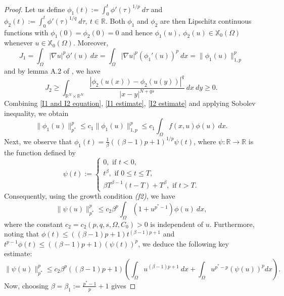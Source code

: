 \documentclass[reqno,oneside]{amsart}
\theoremstyle{definition}
\theoremstyle{remark}
\numberwithin{equation}{section}
\newcommand{\Om} {\Omega}
\newcommand{\sr}{\mathbb{R}}
\newcommand{\ba}{\beta}
\newcommand{\rar}{\rightarrow}
\newcommand{\na} {\nabla}
\newcommand{\xo}{\mathbb{X}_0}
\begin{document}
\begin{proof}
    Let us define $\displaystyle \phi_1 (t):= \int_0^t \phi' (\tau)^{1/p}\ d\tau$ and $\displaystyle \phi_2 (t):= \int_0^t \phi' (\tau)^{1/q}\ d\tau,\ t\in\sr$. Both $\phi_1$ and $\phi_2$ are then Lipschitz continuous functions with $\phi_1(0)=\phi_2(0)=0$ and hence $\phi_1(u),\ \phi_2 (u) \in \xo(\Om)$ whenever $u\in\xo(\Om)$. Moreover, 
    \begin{equation}\label{I1 estimate}
        J_1 = \int_{\Om} |\na u|^p \phi'(u)\ dx = \int_{\Om} |\na u|^p \left(\phi_1'(u)\right)^p\ dx=\|\phi_1 (u)\|^p_{1,p}
    \end{equation}
    and by lemma A.2 of \cite{brasco2016second}, we have
    \begin{equation}\label{I2 estimate}
        J_2 \geq \int_{\sr^N \times \sr^N} \frac{\left|\phi_2\left(u(x)\right) - \phi_2\left(u(y)\right)\right|^q}{|x-y|^{N+qs}}\ dx\ dy \geq 0.
    \end{equation}
    Combining \eqref{I1 and I2 equation}, \eqref{I1 estimate}, \eqref{I2 estimate} and applying Sobolev inequality, we obtain
    \begin{equation*}
        \|\phi_1 (u)\|^p_{p^*} \leq c_1 \|\phi_1 (u)\|^p_{1,p}\leq c_1 \int_{\Om} f(x,u)\phi(u)\ dx.
    \end{equation*}
    Next, we observe that $\phi_1 (t) = \frac{1}{\beta} \left((\beta -1)p +1 \right)^{1/p} \psi (t)$, where $\psi : \sr \rar \sr$ is the function defined by
    \[\psi(t) := \begin{cases}
        0, \text{ if } t < 0,\\[1mm]
        t^{\ba}, \text{ if } 0 \leq t \leq T,\\[1mm]
        \ba T^{\ba -1} (t-T) +T^{\ba}, \text{ if } t > T.
    \end{cases}\]
    Consequently, using the growth condition \textit{(f2)}, we have
    \[\|\psi (u)\|^p_{p^*} \leq c_2 \beta^p \int_{\Om} \left(1+ u^{p^* -1}\right)\phi(u)\ dx,\]
    where the constant $c_2 = c_2 \left(p, q,s,\Om,C_0 \right) >0$ is independent of $u$. Furthermore, noting that $\phi(t) \leq \left((\beta -1)p +1 \right) t^{(\beta -1)p +1}$ and $t^{p-1} \phi(t) \leq \left((\beta -1)p +1 \right) \left(\psi (t)\right)^p$, we deduce the following key estimate:
    \begin{equation}\label{iteration_starting_point}
        \|\psi (u)\|^p_{p^*} \leq c_2 \beta^p \left((\beta -1)p +1 \right) \left( \int_{\Om} u^{(\beta -1)p +1}\ dx + \int_{\Om} u^{p^* -p}\left(\psi (u)\right)^p dx \right).
    \end{equation}
    Now, choosing $\ba =\ba_1 := \frac{p^* -1}{p}+1$ gives

\end{proof}
\end{document}
